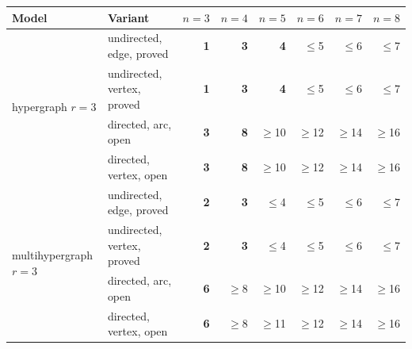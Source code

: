 \begin{tabular}{llrrrrrr}
\toprule
Model & Variant & $n=3$ & $n=4$ & $n=5$ & $n=6$ & $n=7$ & $n=8$ \\
\midrule
\multirow{4}{*}{hypergraph $r=3$} & undirected, edge, \textcolor{vtProved}{proved} & \textcolor{vtExact}{\textbf{1}} & \textcolor{vtExact}{\textbf{3}} & \textcolor{vtExact}{\textbf{4}} & \textcolor{vtProved}{$\le$5} & \textcolor{vtProved}{$\le$6} & \textcolor{vtProved}{$\le$7} \\
 & undirected, vertex, \textcolor{vtProved}{proved} & \textcolor{vtExact}{\textbf{1}} & \textcolor{vtExact}{\textbf{3}} & \textcolor{vtExact}{\textbf{4}} & \textcolor{vtProved}{$\le$5} & \textcolor{vtProved}{$\le$6} & \textcolor{vtProved}{$\le$7} \\
 & directed, arc, \textcolor{vtOpen}{open} & \textcolor{vtExact}{\textbf{3}} & \textcolor{vtExact}{\textbf{8}} & \textcolor{vtOpen}{$\ge$10} & \textcolor{vtOpen}{$\ge$12} & \textcolor{vtOpen}{$\ge$14} & \textcolor{vtOpen}{$\ge$16} \\
 & directed, vertex, \textcolor{vtOpen}{open} & \textcolor{vtExact}{\textbf{3}} & \textcolor{vtExact}{\textbf{8}} & \textcolor{vtOpen}{$\ge$10} & \textcolor{vtOpen}{$\ge$12} & \textcolor{vtOpen}{$\ge$14} & \textcolor{vtOpen}{$\ge$16} \\
\midrule
\multirow{4}{*}{multihypergraph $r=3$} & undirected, edge, \textcolor{vtProved}{proved} & \textcolor{vtExact}{\textbf{2}} & \textcolor{vtExact}{\textbf{3}} & \textcolor{vtProved}{$\le$4} & \textcolor{vtProved}{$\le$5} & \textcolor{vtProved}{$\le$6} & \textcolor{vtProved}{$\le$7} \\
 & undirected, vertex, \textcolor{vtProved}{proved} & \textcolor{vtExact}{\textbf{2}} & \textcolor{vtExact}{\textbf{3}} & \textcolor{vtProved}{$\le$4} & \textcolor{vtProved}{$\le$5} & \textcolor{vtProved}{$\le$6} & \textcolor{vtProved}{$\le$7} \\
 & directed, arc, \textcolor{vtOpen}{open} & \textcolor{vtExact}{\textbf{6}} & \textcolor{vtOpen}{$\ge$8} & \textcolor{vtOpen}{$\ge$10} & \textcolor{vtOpen}{$\ge$12} & \textcolor{vtOpen}{$\ge$14} & \textcolor{vtOpen}{$\ge$16} \\
 & directed, vertex, \textcolor{vtOpen}{open} & \textcolor{vtExact}{\textbf{6}} & \textcolor{vtOpen}{$\ge$8} & \textcolor{vtOpen}{$\ge$11} & \textcolor{vtOpen}{$\ge$12} & \textcolor{vtOpen}{$\ge$14} & \textcolor{vtOpen}{$\ge$16} \\
\bottomrule
\end{tabular}
